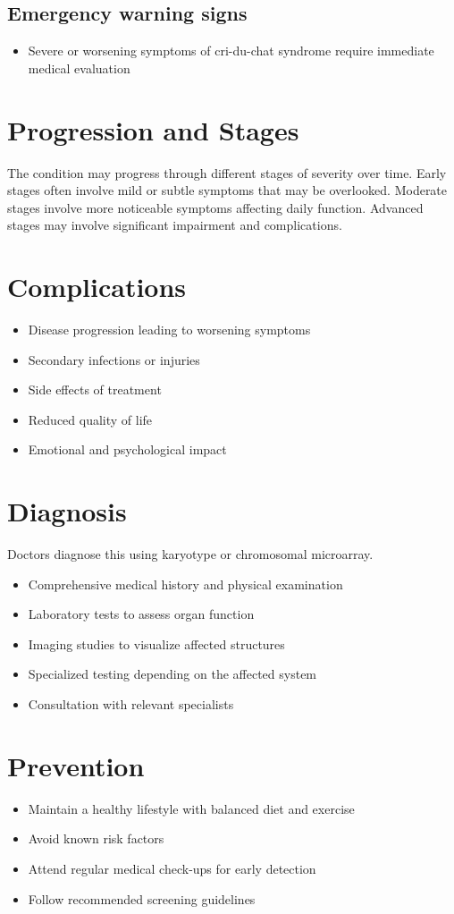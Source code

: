 \subsection{Emergency warning signs}
\begin{itemize}[noitemsep]
  \item Severe or worsening symptoms of cri-du-chat syndrome require immediate medical evaluation
\end{itemize}
\section{Progression and Stages}
The condition may progress through different stages of severity over time. Early stages often involve mild or subtle symptoms that may be overlooked. Moderate stages involve more noticeable symptoms affecting daily function. Advanced stages may involve significant impairment and complications.
\section{Complications}
\begin{itemize}[noitemsep]
  \item Disease progression leading to worsening symptoms
  \item Secondary infections or injuries
  \item Side effects of treatment
  \item Reduced quality of life
  \item Emotional and psychological impact
\end{itemize}
\section{Diagnosis}
Doctors diagnose this using karyotype or chromosomal microarray.

\begin{itemize}[noitemsep]
  \item Comprehensive medical history and physical examination
  \item Laboratory tests to assess organ function
  \item Imaging studies to visualize affected structures
  \item Specialized testing depending on the affected system
  \item Consultation with relevant specialists
\end{itemize}
\section{Prevention}
\begin{itemize}[noitemsep]
  \item Maintain a healthy lifestyle with balanced diet and exercise
  \item Avoid known risk factors
  \item Attend regular medical check-ups for early detection
  \item Follow recommended screening guidelines
\end{itemize}

